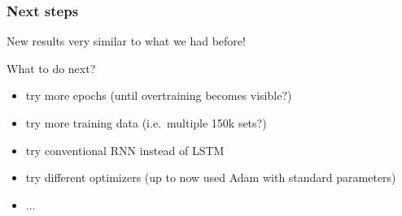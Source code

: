 \documentclass{beamer}
\begin{document}
\begin{frame}
  \frametitle{Next steps}

  New results very similar to what we had before!

  What to do next?
  \begin{itemize}
  \item try more epochs (until overtraining becomes visible?)
  \item try more training data (i.e.~multiple 150k sets?)
  \item try conventional RNN instead of LSTM
  \item try different optimizers (up to now used Adam with standard parameters)
  \item ...
  \end{itemize}

\end{frame}
\end{document}
